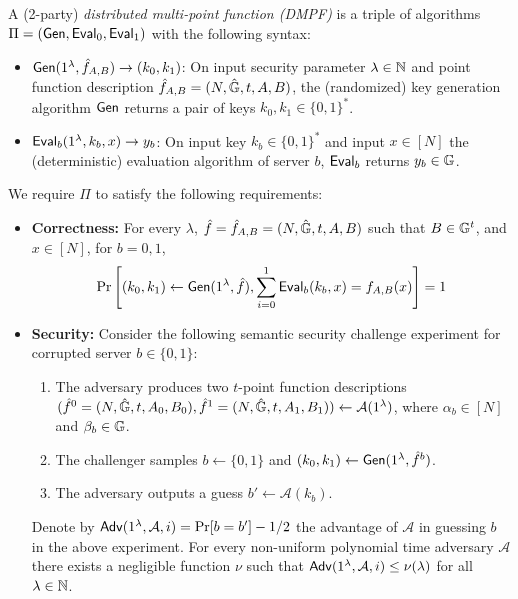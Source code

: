 \begin{definition}[DMPF]\label{def:dmpf}
  A 
  (2-party)
  \emph{distributed multi-point function (DMPF)}
  is a triple of algorithms %
  $\Pi=({\sf Gen},{\sf Eval}_0,{\sf Eval}_1)$
  with the following syntax: 
  \begin{itemize}
      \item ${\sf Gen}(1^\lambda,\hat{f}_{A,B})\rightarrow (k_0,k_1)$: On input security parameter $\lambda\in\mathbb{N}$ and point function description $\hat{f}_{A,B}=(N,\hat{\mathbb{G}},t,A,B)$, the (randomized) key generation algorithm ${\sf Gen}$ returns a pair of keys $k_0,k_1\in\{0,1\}^*$. %
      \item ${\sf Eval}_b(1^\lambda, k_b,x)\rightarrow y_b$: On input key $k_b\in\{0,1\}^*$ and input $x\in[N]$ the (deterministic) evaluation algorithm of server $b$, ${\sf Eval}_b$ returns $y_b\in\mathbb{G}$.
  \end{itemize}
  We require $\Pi$ to satisfy the following requirements:
  \begin{itemize}
      \item \textbf{Correctness:} For every $\lambda$, $\hat{f}=\hat{f}_{A,B}=(N,\hat{\mathbb{G}},t,A,B)$ such that $B\in\mathbb{G}^t$, and $x\in[N]$, for $b=0,1$,
      $$\Pr\left[(k_0,k_1)\leftarrow{\sf Gen}(1^\lambda,\hat{f}), \sum_{i=0}^{1}{\sf Eval}_b(k_b,x)=f_{A,B}(x)\right]=1$$
      \item \textbf{Security:} Consider the following semantic security challenge experiment for corrupted server $b\in\{0,1\}$:
      \begin{enumerate}
          \item The adversary produces two $t$-point function descriptions $(\hat{f}^0=(N,\hat{\mathbb{G}},t,A_0,B_0),\hat{f}^1=(N,\hat{\mathbb{G}},t,A_1,B_1))\leftarrow\mathcal{A}(1^\lambda)$, where $\alpha_b\in[N]$ and $\beta_b\in\mathbb{G}$.
          \item The challenger samples $b\gets\{0,1\}$ and $(k_0,k_1)\leftarrow{\sf Gen}(1^\lambda,\hat{f}^b)$.
          \item The adversary outputs a guess $b'\leftarrow\mathcal{A}(k_b)$.
      \end{enumerate}
      Denote by ${\sf Adv}(1^\lambda,\mathcal{A},i)=\Pr[b=b']-1/2$ the advantage of $\mathcal{A}$ in guessing $b$ in the above experiment. For every non-uniform polynomial time adversary $\mathcal{A}$ there exists a negligible function $\nu$ such that ${\sf Adv}(1^\lambda,\mathcal{A},i) \le \nu(\lambda)$ for all $\lambda \in \mathbb{N}$.
  \end{itemize}
  \end{definition}
 
